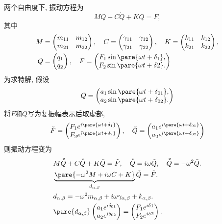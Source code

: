 \documentclass{ctexart}
\begin{document}
两个自由度下, 振动方程为
\[ M\ddot{Q} + C\dot{Q} + KQ = F, \]
其中
\begin{align*}
    M &= \begin{pmatrix}
    m_{11} & m_{12} \\
    m_{21} & m_{22}
\end{pmatrix},\quad C = \begin{pmatrix}
    \gamma_{11} & \gamma_{12} \\
    \gamma_{21} & \gamma_{22}
\end{pmatrix},\quad K = \begin{pmatrix}
    k_{11} & k_{12} \\
    k_{21} & k_{22}
\end{pmatrix},\\ Q &= \begin{pmatrix}
    q_1 \\ q_2
\end{pmatrix},\quad F = \begin{pmatrix}
    F_1 \sin \pare{\omega t + \delta_1}, \\
    F_2 \sin \pare{\omega t + \delta 2}.
\end{pmatrix}
\end{align*}
为求特解, 假设
\[ Q = \begin{pmatrix}
    a_1 \sin\pare{\omega t + \delta_{01}}, \\
    a_2 \sin\pare{\omega t + \delta_{02}}.
\end{pmatrix} \]
将$F$和$Q$写为复振幅表示后取虚部,
\[ \tilde{F} = \begin{pmatrix}
    F_1 e^{i\pare{\omega t + \delta_1}} \\
    F_2 e^{i\pare{\omega t + \delta_2}}
\end{pmatrix},\quad \tilde{Q} = \begin{pmatrix}
    a_1 e^{i\pare{\omega t + \delta_{01}}} \\
    a_2 e^{i\pare{\omega t + \delta_{02}}}
\end{pmatrix}
\]
则振动方程变为
\begin{align*}
    & M\ddot{\tilde{Q}} + C\dot{\tilde{Q}} + K\tilde{Q} = \tilde{F},\quad \dot{\tilde{Q}} = i\omega\tilde{Q},\quad \ddot{\tilde{Q}} = -\omega^2 \tilde{Q}. \\
    & \underbrace{\pare{-\omega^2 M + i\omega C + K}}_{d_{\alpha,\beta}}\tilde{Q} = \tilde{F}. \\
    & d_{\alpha,\beta} = -\omega^2 m_{\alpha,\beta} + i\omega \gamma_{\alpha,\beta} + k_{\alpha,\beta}. \\
    & \pare{d_{\alpha,\beta}} \begin{pmatrix}
        a_1 e^{i\delta_{01}} \\
        a_2 e^{i\delta_{02}}
    \end{pmatrix} = \begin{pmatrix}
        F_1 e^{i\delta 1} \\
        F_2 e^{i\delta 2}
    \end{pmatrix}.
\end{align*}
\end{document}
